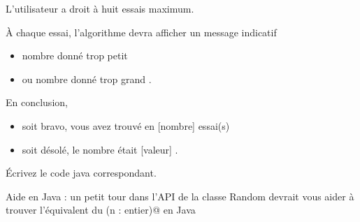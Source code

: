 \documentclass[11pt,a4paper]{article}
\begin{document}
          L'utilisateur a droit \`a huit essais maximum.\par
				
          \`A chaque essai, l'algorithme devra afficher un message indicatif
          
					\begin{itemize}
				
			\item \guillemotleft  nombre donn\'e trop petit \guillemotright 
			\item ou \guillemotleft  nombre donn\'e trop grand \guillemotright . 
					\end{itemize}
				
          En conclusion, 
          
					\begin{itemize}
				
			\item soit \guillemotleft  bravo, vous avez trouv\'e en [nombre] essai(s) \guillemotright 
			\item soit \guillemotleft  d\'esol\'e, le nombre \'etait [valeur] \guillemotright .
					\end{itemize}
				
            \par
        \'Ecrivez le code java correspondant.
            \par
        
        Aide en Java : un petit tour dans l'API de la classe Random devrait vous aider \`a trouver l'\'equivalent du
        \verb@hasard(n : entier)@ en Java
    
            \par
        
				
\end{document}
